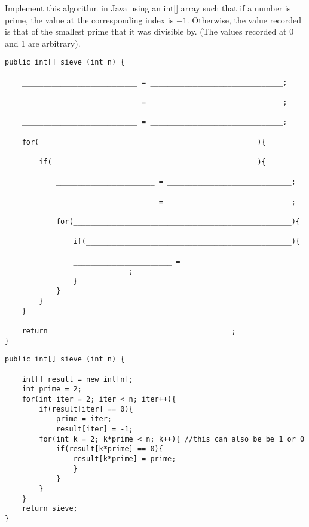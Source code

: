 Implement this algorithm in Java using an int[] array such that if a number is prime, the value at the corresponding index is $-1$. Otherwise, the value recorded is that of the smallest prime that it was divisible by. (The values recorded at 0 and 1 are arbitrary). \\
\begin{lstlisting}
public int[] sieve (int n) {

    ___________________________ = _______________________________;

    ___________________________ = _______________________________;

    ___________________________ = _______________________________;

    for(___________________________________________________){

        if(________________________________________________){

            _______________________ = _____________________________;

            _______________________ = _____________________________;

            for(___________________________________________________){

                if(________________________________________________){

                _______________________ = _____________________________;
                }
            }
        }
    }
    
    return __________________________________________;
}
\end{lstlisting}
\begin{solution}
\begin{lstlisting}
public int[] sieve (int n) {

    int[] result = new int[n];
    int prime = 2;
    for(int iter = 2; iter < n; iter++){
        if(result[iter] == 0){
            prime = iter;
            result[iter] = -1;
        for(int k = 2; k*prime < n; k++){ //this can also be be 1 or 0
            if(result[k*prime] == 0){
                result[k*prime] = prime;
                }
            }
        }
    }
    return sieve;
}
\end{lstlisting}
\end{solution}
